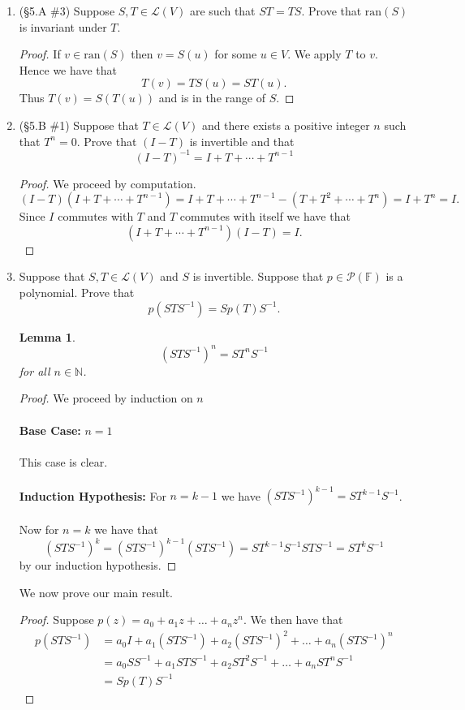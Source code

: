 \documentclass[12pt,letterpaper]{article}
\theoremstyle{plain}
\newtheorem{lemma}[theorem]{Lemma}
\theoremstyle{definition}
\begin{document}
\begin{enumerate}[1.]
\item (\S 5.A \#3) Suppose $S,T\in \mathcal{L}(V)$ are such that $ST=TS$. Prove that $\text{ran}(S)$ is invariant under $T$. 
\begin{proof} If $v\in \text{ran}(S)$ then $v=S(u)$ for some $u\in V$. We apply $T$ to $v$. Hence we have that 
\[T(v)=TS(u)=ST(u).\]
Thus $T(v)=S(T(u))$ and is in the range of $S$. 
\end{proof}
\item (\S5.B \#1) Suppose that $T\in \mathcal{L}(V)$ and there exists a positive integer $n$ such that $T^n=0$. Prove that $(I-T)$ is invertible and that 
\[(I-T)^{-1}=I+T+\cdots +T^{n-1}\]
\begin{proof} We proceed by computation. 
\[(I-T)(I+T+\cdots+T^{n-1})=I+T+\cdots+T^{n-1}-(T+T^2+\cdots+T^n)=I+T^n=I.\]
Since $I$ commutes with $T$ and $T$ commutes with itself we have that 
\[(I+T+\cdots+T^{n-1})(I-T)=I.\]
\end{proof}
\item Suppose that $S,T\in \mathcal{L}(V)$ and $S$ is invertible. Suppose that $p\in \mathcal{P}(\mathbb{F})$ is a polynomial. Prove that 
\[p(STS^{-1})=Sp(T)S^{-1}.\]
\begin{lemma}
\[(STS^{-1})^n=ST^nS^{-1}\]
for all $n\in \mathbb{N}$.
\end{lemma}
\begin{proof} We proceed by induction on $n$\\
\ \\
{\bf Base Case: }$n=1$\\
\ \\
This case is clear. \\
\ \\
{\bf Induction Hypothesis: }For $n=k-1$ we have $(STS^{-1})^{k-1}=ST^{k-1}S^{-1}$.\\
\ \\
Now for $n=k$ we have that 
\[(STS^{-1})^k=(STS^{-1})^{k-1}(STS^{-1})=ST^{k-1}S^{-1}STS^{-1}=ST^{k}S^{-1}\]
by our induction hypothesis.
\end{proof} 
We now prove our main result.
\begin{proof}Suppose $p(z)=a_0+a_1z+\ldots+a_nz^n$. We then have that 
\begin{align*}
p(STS^{-1})&=a_0I+a_1(STS^{-1})+a_2(STS^{-1})^2+\ldots +a_n(STS^{-1})^n\\
&=a_0SS^{-1}+a_1STS^{-1}+a_2ST^2S^{-1}+\ldots +a_nST^nS^{-1}\\
&=Sp(T)S^{-1}
\end{align*}

\end{proof}
\end{enumerate}
\end{document}
